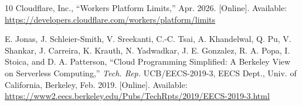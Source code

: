 \documentclass[conference]{IEEEtran}
\begin{document}
\begin{thebibliography}{10}
  Cloudflare, Inc.,
  ``Workers Platform Limits,''
  Apr. 2026. [Online]. Available:
  \url{https://developers.cloudflare.com/workers/platform/limits}

  E. Jonas, J. Schleier-Smith, V. Sreekanti, C.-C. Tsai, A. Khandelwal,
  Q. Pu, V. Shankar, J. Carreira, K. Krauth, N. Yadwadkar,
  J. E. Gonzalez, R. A. Popa, I. Stoica, and D. A. Patterson,
  ``Cloud Programming Simplified: A Berkeley View on Serverless
  Computing,''
  \textit{Tech. Rep.} UCB/EECS-2019-3, EECS Dept., Univ. of California,
  Berkeley, Feb. 2019. [Online]. Available:
  \url{https://www2.eecs.berkeley.edu/Pubs/TechRpts/2019/EECS-2019-3.html}

\end{thebibliography}
\end{document}
